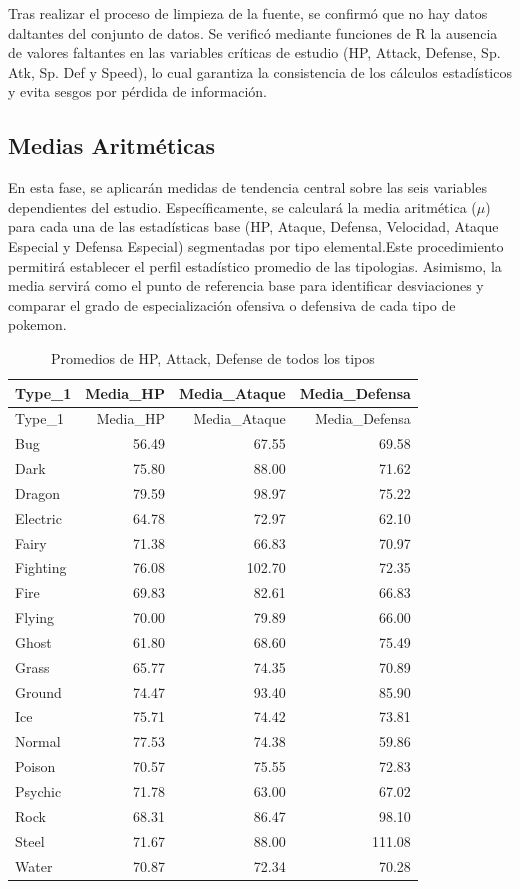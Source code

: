 \documentclass[oneside,11pt]{Latex/Classes/PhDthesisPSnPDF}
\begin{document}
Tras realizar el proceso de limpieza de la fuente, se confirmó que no
hay datos daltantes del conjunto de datos. Se verificó mediante
funciones de R la ausencia de valores faltantes en las variables
críticas de estudio (HP, Attack, Defense, Sp. Atk, Sp. Def y Speed), lo
cual garantiza la consistencia de los cálculos estadísticos y evita
sesgos por pérdida de información.

\subsection{Medias Aritméticas}

En esta fase, se aplicarán medidas de tendencia central sobre las seis
variables dependientes del estudio. Específicamente, se calculará la
media aritmética (\(\mu\)) para cada una de las estadísticas base (HP,
Ataque, Defensa, Velocidad, Ataque Especial y Defensa Especial)
segmentadas por tipo elemental.Este procedimiento permitirá establecer
el perfil estadístico promedio de las tipologias. Asimismo, la media
servirá como el punto de referencia base para identificar desviaciones y
comparar el grado de especialización ofensiva o defensiva de cada tipo
de pokemon.

\begin{longtable}[]{@{}lrrr@{}}
\caption{Promedios de HP, Attack, Defense de todos los
tipos}\tabularnewline
\toprule\noalign{}
Type\_1 & Media\_HP & Media\_Ataque & Media\_Defensa \\
\midrule\noalign{}
\endfirsthead
\toprule\noalign{}
Type\_1 & Media\_HP & Media\_Ataque & Media\_Defensa \\
\midrule\noalign{}
\endhead
\bottomrule\noalign{}
\endlastfoot
Bug & 56.49 & 67.55 & 69.58 \\
Dark & 75.80 & 88.00 & 71.62 \\
Dragon & 79.59 & 98.97 & 75.22 \\
Electric & 64.78 & 72.97 & 62.10 \\
Fairy & 71.38 & 66.83 & 70.97 \\
Fighting & 76.08 & 102.70 & 72.35 \\
Fire & 69.83 & 82.61 & 66.83 \\
Flying & 70.00 & 79.89 & 66.00 \\
Ghost & 61.80 & 68.60 & 75.49 \\
Grass & 65.77 & 74.35 & 70.89 \\
Ground & 74.47 & 93.40 & 85.90 \\
Ice & 75.71 & 74.42 & 73.81 \\
Normal & 77.53 & 74.38 & 59.86 \\
Poison & 70.57 & 75.55 & 72.83 \\
Psychic & 71.78 & 63.00 & 67.02 \\
Rock & 68.31 & 86.47 & 98.10 \\
Steel & 71.67 & 88.00 & 111.08 \\
Water & 70.87 & 72.34 & 70.28 \\
\end{longtable}
\end{document}
